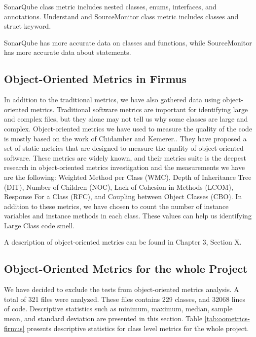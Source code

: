 SonarQube class metric includes nested classes, enums, interfaces, and annotations. Understand and SourceMonitor class metric includes classes and struct keyword. 

SonarQube has more accurate data on classes and functions, while SourceMonitor has more accurate data about statements. 























\subsection{Object-Oriented Metrics in Firmus}
In addition to the traditional metrics, we have also gathered data using object-oriented metrics. Traditional software metrics are important for identifying large and complex files, but they alone may not tell us why some classes are large and complex. Object-oriented metrics we have used to measure the quality of the code is mostly based on the work of Chidamber and Kemerer.\cite{chidamber1994metrics}. They have proposed a set of static metrics that are designed to measure the quality of object-oriented software. These metrics are widely known, and their metrics suite is the deepest research in object-oriented metrics investigation and the measurements we have are the following: Weighted Method per Class (WMC), Depth of Inheritance Tree (DIT), Number of Children (NOC), Lack of Cohesion in Methods (LCOM), Response For a Class (RFC), and Coupling between Object Classes (CBO). In addition to these metrics, we have chosen to count the number of instance variables and instance methods in each class. These values can help us identifying Large Class code smell. 


A description of object-oriented metrics can be found in Chapter 3, Section X. 


\subsection{Object-Oriented Metrics for the whole Project}
 We have decided to exclude the tests from object-oriented metrics analysis. A total of 321 files were analyzed. These files contains 229 classes, and 32068 lines of code. Descriptive statistics such as minimum, maximum, median, sample mean, and standard deviation are presented in this section. Table \ref{tab:oometrics-firmus} presents descriptive statistics for class level metrics for the whole project.

